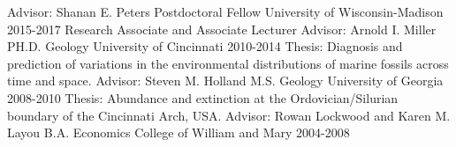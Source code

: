 \begin{cventries}
   \cventry
    {Advisor: Shanan E. Peters}
    {Postdoctoral Fellow}
    {University of Wisconsin-Madison}
    {2015-2017}
    {Research Associate and Associate Lecturer}
  \cventry
    {Advisor: Arnold I. Miller}
    {PH.D. Geology}
    {University of Cincinnati}
    {2010-2014}
    {Thesis: Diagnosis and prediction of variations in the environmental distributions of marine fossils across time and space.}
    \cventry
    {Advisor: Steven M. Holland}
    {M.S. Geology}
    {University of Georgia}
    {2008-2010}
    {Thesis: Abundance and extinction at the Ordovician/Silurian boundary of the Cincinnati Arch, USA.}
    \cventry
    {Advisor: Rowan Lockwood and Karen M. Layou}
    {B.A. Economics}
    {College of William and Mary}
    {2004-2008}{}
\end{cventries}